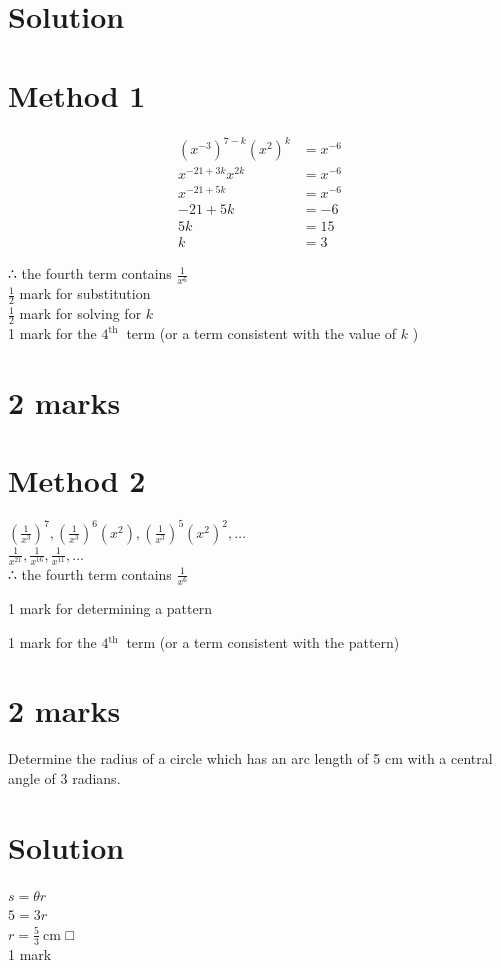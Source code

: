 \documentclass[10pt]{article}
\begin{document}
\section*{Solution}
\section*{Method 1}
$$
\begin{aligned}
\left(x^{-3}\right)^{7-k}\left(x^{2}\right)^{k} & =x^{-6} \\
x^{-21+3 k} x^{2 k} & =x^{-6} \\
x^{-21+5 k} & =x^{-6} \\
-21+5 k & =-6 \\
5 k & =15 \\
k & =3
\end{aligned}
$$

∴ the fourth term contains $\frac{1}{x^{6}}$\\
$\frac{1}{2}$ mark for substitution\\
$\frac{1}{2}$ mark for solving for $k$\\
1 mark for the $4^{\text {th }}$ term (or a term consistent with the value of $k$ )

\section*{2 marks}
\section*{Method 2}
$\left(\frac{1}{x^{3}}\right)^{7},\left(\frac{1}{x^{3}}\right)^{6}\left(x^{2}\right),\left(\frac{1}{x^{3}}\right)^{5}\left(x^{2}\right)^{2}, \ldots$\\
$\frac{1}{x^{21}}, \frac{1}{x^{16}}, \frac{1}{x^{11}}, \ldots$\\
∴ the fourth term contains $\frac{1}{x^{6}}$

1 mark for determining a pattern

1 mark for the $4{ }^{\text {th }}$ term (or a term consistent with the pattern)

\section*{2 marks}
Determine the radius of a circle which has an arc length of 5 cm with a central angle of 3 radians.

\section*{Solution}
$s=\theta r$\\
$5=3 r$\\
$r=\frac{5}{3} \mathrm{~cm}$ □\\
1 mark
\end{document}
